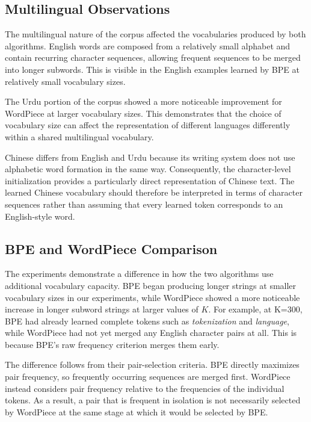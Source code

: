 \documentclass[sigconf]{acmart}
\begin{document}
\subsection{Multilingual Observations}

The multilingual nature of the corpus affected the vocabularies
produced by both algorithms. English words are composed from a
relatively small alphabet and contain recurring character sequences,
allowing frequent sequences to be merged into longer subwords. This is
visible in the English examples learned by BPE at relatively small
vocabulary sizes.

The Urdu portion of the corpus showed a more noticeable improvement
for WordPiece at larger vocabulary sizes. This demonstrates that the
choice of vocabulary size can affect the representation of different
languages differently within a shared multilingual vocabulary.

Chinese differs from English and Urdu because its writing system does
not use alphabetic word formation in the same way. Consequently, the
character-level initialization provides a particularly direct
representation of Chinese text. The learned Chinese vocabulary should
therefore be interpreted in terms of character sequences rather than
assuming that every learned token corresponds to an English-style
word.

\subsection{BPE and WordPiece Comparison}

The experiments demonstrate a difference in how the two algorithms use
additional vocabulary capacity. BPE began producing longer strings at
smaller vocabulary sizes in our experiments, while WordPiece showed a
more noticeable increase in longer subword strings at larger values of
\(K\). For example, at K=300, BPE had already learned complete tokens such 
as \textit{tokenization} and \textit{language}, while WordPiece had 
not yet merged any English character pairs at all. This is because BPE's raw frequency criterion merges them early.

The difference follows from their pair-selection criteria. BPE directly
maximizes pair frequency, so frequently occurring sequences are merged
first. WordPiece instead considers pair frequency relative to the
frequencies of the individual tokens. As a result, a pair that is
frequent in isolation is not necessarily selected by WordPiece at the
same stage at which it would be selected by BPE.
\end{document}
